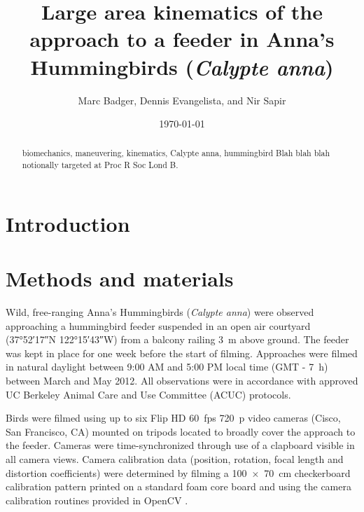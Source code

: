 \documentclass{rspublic}
\newcommand{\Calypteanna}{\emph{Calypte anna}}
\begin{document}
\title[Anna's Hummingbird approach kinematics]{Large area kinematics of the approach to a feeder in Anna's Hummingbirds (\Calypteanna)}
\author[M. Badger, D. Evangelista, and N. Sapir]{Marc Badger, Dennis Evangelista, and Nir Sapir}
\date{\today}
\label{firstpage}
\maketitle


\begin{abstract}{biomechanics, maneuvering, kinematics, Calypte anna, hummingbird}
Blah blah blah notionally targeted at Proc R Soc Lond B. 
\end{abstract}




\section{Introduction}
\section{Methods and materials}
Wild, free-ranging Anna's Hummingbirds (\Calypteanna) were observed approaching a hummingbird feeder suspended in an open air courtyard (\ang{37;52;17}N \ang{122;15;43}W) from a balcony railing \SI{3}{\meter} above ground.  The feeder was kept in place for one week before the start of filming. Approaches were filmed in natural daylight between 9:00 AM and 5:00 PM local time (GMT - \SI{7}{\hour}) between March and May 2012.  All observations were in accordance with approved UC Berkeley Animal Care and Use Committee (ACUC) protocols.  

Birds were filmed using up to six Flip HD \SI{60}{fps} \SI{720}{p} video cameras (Cisco, San Francisco, CA) mounted on tripods located to broadly cover the approach to the feeder. Cameras were time-synchronized through use of a clapboard visible in all camera views.  Camera calibration data (position, rotation, focal length and distortion coefficients) were determined by filming a \SI{100x70}{\centi\meter} checkerboard calibration pattern printed on a standard foam core board and using the camera calibration routines provided in OpenCV \citep{OpenCV, Bradski:2008}. 
\end{document}
